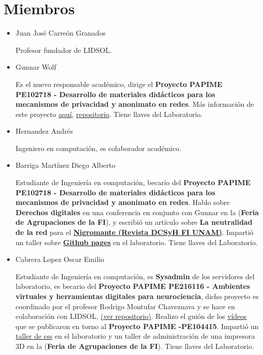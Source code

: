 \documentclass[a4paper,11pt]{article}                 %
\begin{document}
  \section{Miembros}
  \begin{itemize}
    \item Juan José Carreón Granados
    
    Profesor fundador de LIDSOL.
    
    \item Gunnar Wolf 
    
    Es el nuevo responsable académico, dirige el \textbf{Proyecto PAPIME PE102718 - Desarrollo de materiales didácticos para los mecanismos de privacidad y anonimato en redes}. Más información de este proyecto \href{https://www.priv-anon.unam.mx/}{aquí}, \href{https://github.com/LIDSOL/papime-pe102718-mecanismos-de-privacidad-y-anonimato}{repositorio}. Tiene llaves del Laboratorio.
    
    \item Hernandez Andrés
    
    Ingeniero en computación, es colaborador académico.
    
    \item Barriga Martínez Diego Alberto
    
    Estudiante de Ingeniería en computación, becario del \textbf{Proyecto PAPIME PE102718 - Desarrollo de materiales didácticos para los mecanismos de privacidad y anonimato en redes}. Hablo sobre \textbf{Derechos digitales} en una conferencia en conjunto con Gunnar en la (\textbf{Feria de Agrupaciones de la FI}), y escribió un artículo sobre \textbf{La neutralidad de la red} para el \href{https://issuu.com/nigromantefi}{\textbf{Nigromante  (Revista DCSyH FI  UNAM)}}. Impartió un taller sobre \href{https://github.com/umoqnier/personal-page}{\textbf{Github pages}} en el laboratorio. Tiene llaves del Laboratorio.
    
    \item Cabrera Lopez Oscar Emilio 
    
    Estudiante de Ingeniería en computación, es \textbf{Sysadmin} de los servidores del laboratorio, es becario del \textbf{Proyecto PAPIME PE216116 - Ambientes virtuales y herramientas digitales para neurociencia}, dicho proyecto es coordinado por el profesor Rodrigo Montufar Chaveznava y se hace en colaboración con LIDSOL, \href{https://github.com/LIDSOL/portia}{(ver repositorio)}. Realizo el guión de los \href{https://www.youtube.com/channel/UCwHFqMqxUcCAJSdek3e4zOw}{vídeos} que se publicaron en torno al  \textbf{Proyecto PAPIME -PE104415}. Impartió un \href{https://lidsol.org/talleres/0002_css_basico.html}{taller de css} en el laboratorio y un taller de administración de una impresora 3D en la (\textbf{Feria de Agrupaciones de la FI}). Tiene llaves del Laboratorio.
    

\end{itemize}
\end{document}
